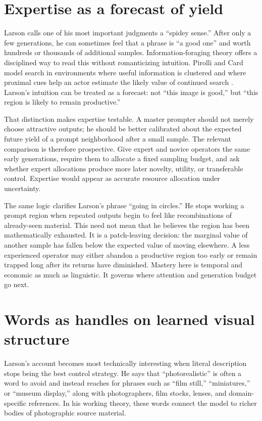 \documentclass[11pt]{article}
\begin{document}
\section{Expertise as a forecast of yield}
Larson calls one of his most important judgments a ``spidey sense.'' After only a few generations, he can sometimes feel that a phrase is ``a good one'' and worth hundreds or thousands of additional samples. Information-foraging theory offers a disciplined way to read this without romanticizing intuition. Pirolli and Card model search in environments where useful information is clustered and where proximal cues help an actor estimate the likely value of continued search \cite{PirolliCard1999}. Larson's intuition can be treated as a forecast: not ``this image is good,'' but ``this region is likely to remain productive.''

That distinction makes expertise testable. A master prompter should not merely choose attractive outputs; he should be better calibrated about the expected future yield of a prompt neighborhood after a small sample. The relevant comparison is therefore prospective. Give expert and novice operators the same early generations, require them to allocate a fixed sampling budget, and ask whether expert allocations produce more later novelty, utility, or transferable control. Expertise would appear as accurate resource allocation under uncertainty.

The same logic clarifies Larson's phrase ``going in circles.'' He stops working a prompt region when repeated outputs begin to feel like recombinations of already-seen material. This need not mean that he believes the region has been mathematically exhausted. It is a patch-leaving decision: the marginal value of another sample has fallen below the expected value of moving elsewhere. A less experienced operator may either abandon a productive region too early or remain trapped long after its returns have diminished. Mastery here is temporal and economic as much as linguistic. It governs where attention and generation budget go next.

\section{Words as handles on learned visual structure}
Larson's account becomes most technically interesting when literal description stops being the best control strategy. He says that ``photorealistic'' is often a word to avoid and instead reaches for phrases such as ``film still,'' ``miniatures,'' or ``museum display,'' along with photographers, film stocks, lenses, and domain-specific references. In his working theory, these words connect the model to richer bodies of photographic source material.
\end{document}
